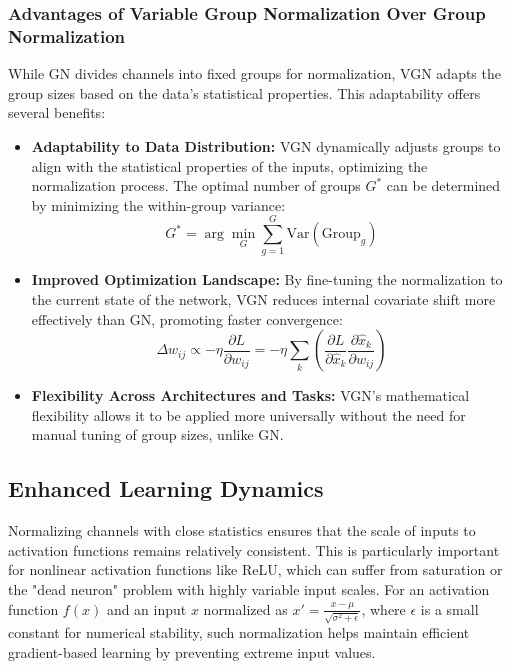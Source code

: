 \subsubsection{Advantages of Variable Group Normalization Over Group Normalization}

While GN divides channels into fixed groups for normalization, VGN adapts the group sizes based on the data's statistical properties. This adaptability offers several benefits:

\begin{itemize}
    \item \textbf{Adaptability to Data Distribution:}
    VGN dynamically adjusts groups to align with the statistical properties of the inputs, optimizing the normalization process. The optimal number of groups \(G^*\) can be determined by minimizing the within-group variance:
    \[
    G^* = \arg\min_G \sum_{g=1}^G \text{Var}(\text{Group}_g)
    \]

    \item \textbf{Improved Optimization Landscape:}
    By fine-tuning the normalization to the current state of the network, VGN reduces internal covariate shift more effectively than GN, promoting faster convergence:
    \[
    \Delta w_{ij} \propto -\eta \frac{\partial L}{\partial w_{ij}} = -\eta \sum_k \left( \frac{\partial L}{\partial \hat{x}_k} \frac{\partial \hat{x}_k}{\partial w_{ij}} \right)
    \]

    \item \textbf{Flexibility Across Architectures and Tasks:}
    VGN's mathematical flexibility allows it to be applied more universally without the need for manual tuning of group sizes, unlike GN.
\end{itemize}


\subsection{Enhanced Learning Dynamics}
Normalizing channels with close statistics ensures that the scale of inputs to activation functions remains relatively consistent. This is particularly important for nonlinear activation functions like ReLU, which can suffer from saturation or the "dead neuron" problem with highly variable input scales. For an activation function \(f(x)\) and an input \(x\) normalized as \(x' = \frac{x - \mu}{\sqrt{\sigma^2 + \epsilon}}\), where \(\epsilon\) is a small constant for numerical stability, such normalization helps maintain efficient gradient-based learning by preventing extreme input values.

